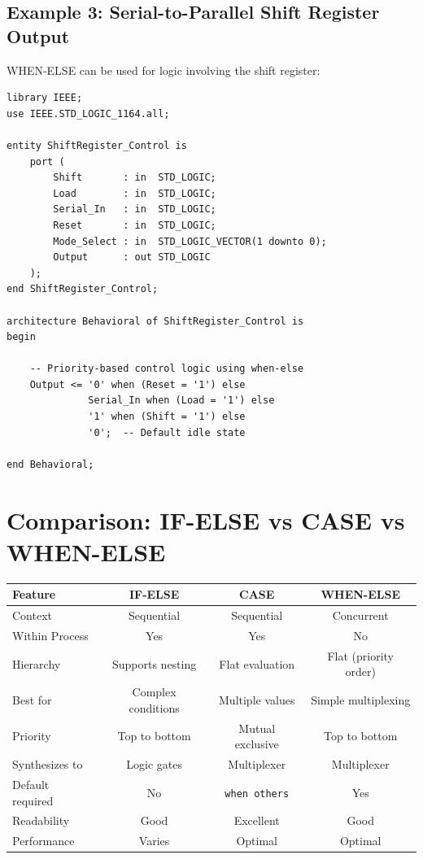 \documentclass[12pt,a4paper]{article}
\begin{document}
\subsection{Example 3: Serial-to-Parallel Shift Register Output}

WHEN-ELSE can be used for logic involving the shift register:

\begin{lstlisting}
library IEEE;
use IEEE.STD_LOGIC_1164.all;

entity ShiftRegister_Control is
    port (
        Shift       : in  STD_LOGIC;
        Load        : in  STD_LOGIC;
        Serial_In   : in  STD_LOGIC;
        Reset       : in  STD_LOGIC;
        Mode_Select : in  STD_LOGIC_VECTOR(1 downto 0);
        Output      : out STD_LOGIC
    );
end ShiftRegister_Control;

architecture Behavioral of ShiftRegister_Control is
begin
    
    -- Priority-based control logic using when-else
    Output <= '0' when (Reset = '1') else
              Serial_In when (Load = '1') else
              '1' when (Shift = '1') else
              '0';  -- Default idle state
    
end Behavioral;
\end{lstlisting}

\newpage
\section{Comparison: IF-ELSE vs CASE vs WHEN-ELSE}

\begin{table}[h]
\centering
\begin{tabular}{|l|c|c|c|}
\hline
\textbf{Feature} & \textbf{IF-ELSE} & \textbf{CASE} & \textbf{WHEN-ELSE} \\
\hline
Context & Sequential & Sequential & Concurrent \\
\hline
Within Process & Yes & Yes & No \\
\hline
Hierarchy & Supports nesting & Flat evaluation & Flat (priority order) \\
\hline
Best for & Complex conditions & Multiple values & Simple multiplexing \\
\hline
Priority & Top to bottom & Mutual exclusive & Top to bottom \\
\hline
Synthesizes to & Logic gates & Multiplexer & Multiplexer \\
\hline
Default required & No & \texttt{when others} & Yes \\
\hline
Readability & Good & Excellent & Good \\
\hline
Performance & Varies & Optimal & Optimal \\
\hline
\end{tabular}
\end{table}
\end{document}
